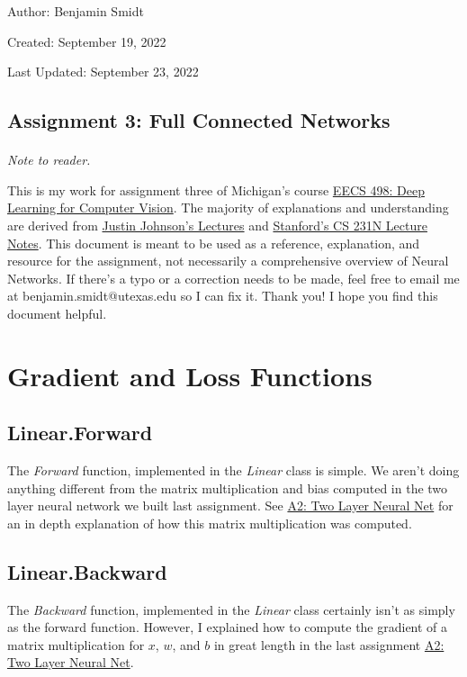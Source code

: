 \documentclass[12pt]{article}
\begin{document}
\noindent Author: Benjamin Smidt

\noindent Created: September 19, 2022

\noindent Last Updated: September 23, 2022
\begin{center}
\section*{Assignment 3: Full Connected Networks}
\end{center}

\paragraph{} \emph{Note to reader.} 

This is my work for assignment three of Michigan's course
\href{https://web.eecs.umich.edu/~justincj/teaching/eecs498/WI2022/}
{EECS 498: Deep Learning for Computer Vision}. The majority of explanations and understanding are 
derived from \href{https://www.youtube.com/watch?v=dJYGatp4SvA&list=PL5-TkQAfAZFbzxjBHtzdVCWE0Zbhomg7r&index=1}
{Justin Johnson's Lectures} and \href{http://cs231n.stanford.edu/schedule.html}{Stanford's CS 231N Lecture Notes}.
This document is meant to be used as a reference, 
explanation, and resource for the assignment, not necessarily a comprehensive overview
of Neural Networks. If there's a typo or a correction needs to be made, feel free to 
email me at benjamin.smidt@utexas.edu so I can fix it. Thank you! I hope you find this 
document helpful.

\newpage
\tableofcontents{}
\newpage

\section{Gradient and Loss Functions}

\subsection{Linear.Forward}
The \emph{Forward} function, implemented in the \emph{Linear} class is simple. We aren't doing 
anything different from the matrix multiplication and bias computed in the two layer
neural network we built last assignment. See \href{https://github.com/bensmidt/EECS-498-DL-Computer-Vision/blob/main/A2/A2-Two-Layer-NN.pdf}
{A2: Two Layer Neural Net} for an in depth explanation of how this matrix multiplication was 
computed. 

\subsection{Linear.Backward}
The \emph{Backward} function, implemented in the \emph{Linear} class certainly isn't
as simply as the forward function. However, I explained how to compute the gradient of 
a matrix multiplication for $x$, $w$, and $b$ in great length in the last assignment 
\href{https://github.com/bensmidt/EECS-498-DL-Computer-Vision/blob/main/A2/A2-Two-Layer-NN.pdf}
{A2: Two Layer Neural Net}.
\end{document}
